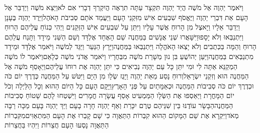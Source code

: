 \documentclass[../main/main.tex]{subfiles}
\begin{document}
\begin{multicols*}{\ncols}
וַיֹּאמֶר יַהְוֶה אֶל מֹשֶׁה הֲיַד יַהְוֶה תִּקְצָר עַתָּה תִרְאֶה הֲיִקְרְךָ דְבָרִי אִם לֹא\PreVerseSpace{}וַיֵּצֵא מֹשֶׁה וַיְדַבֵּר אֶל הָעָם אֵת דִּבְרֵי יַהְוֶה וַיֶּאֱסֹף שִׁבְעִים אִישׁ מִזִּקְנֵי הָעָם וַיַּעֲמֵד אֹתָם סְבִיבֹת הָאֹהֶל\PreVerseSpace{}וַיֵּרֶד יַהְוֶה בֶּעָנָן וַיְדַבֵּר אֵלָיו וַיָּאצֶל מִן הָרוּחַ אֲשֶׁר עָלָיו וַיִּתֵּן עַל שִׁבְעִים אִישׁ הַזְּקֵנִים וַיְהִי כְּנוֹחַ עֲלֵיהֶם הָרוּחַ וַיִּתְנַבְּאוּ וְלֹא יָסָפוּ\PreVerseSpace{}וַיִּשָּׁאֲרוּ שְׁנֵי אֲנָשִׁים בַּמַּחֲנֶה שֵׁם הָאֶחָד אֶלְדָּד וְשֵׁם הַשֵּׁנִי מֵידָד וַתָּנַח עֲלֵהֶם הָרוּחַ וְהֵמָּה בַּכְּתֻבִים וְלֹא יָצְאוּ הָאֹהֱלָה וַיִּתְנַבְּאוּ בַּמַּחֲנֶה\PreVerseSpace{}וַיָּרָץ הַנַּעַר וַיַּגֵּד לְמֹשֶׁה וַיֹּאמַר אֶלְדָּד וּמֵידָד מִתְנַבְּאִים בַּמַּחֲנֶה\PreVerseSpace{}וַיַּעַן יְהוֹשֻׁעַ בִּן נוּן מְשָׁרֵת מֹשֶׁה מִבְּחֻרָיו וַיֹּאמַר אֲדֹנִי מֹשֶׁה כְּלָאֵם\PreVerseSpace{}וַיֹּאמֶר לוֹ מֹשֶׁה הַמְקַנֵּא אַתָּה לִי וּמִי יִתֵּן כָּל עַם יַהְוֶה נְבִיאִים כִּי יִתֵּן יַהְוֶה אֶת רוּחוֹ עֲלֵיהֶם\PreVerseSpace{}וַיֵּאָסֵף מֹשֶׁה אֶל הַמַּחֲנֶה הוּא וְזִקְנֵי יִשְׂרָאֵל\PreVerseSpace{}וְרוּחַ נָסַע מֵאֵת יַהְוֶה וַיָּגֶז\SubEnd{} שְׂלָו\SubEnd{} מִן הַיָּם וַיִּטֹּשׁ עַל הַמַּחֲנֶה כְּדֶרֶךְ יוֹם כֹּה וּכְדֶרֶךְ יוֹם כֹּה סְבִיבוֹת הַמַּחֲנֶה וּכְאַמָּתַיִם עַל פְּנֵי הָאָרֶץ\PreVerseSpace{}וַיָּקָם הָעָם כָּל הַיּוֹם הַהוּא וְכָל הַלַּיְלָה וְכֹל יוֹם הַמָּחֳרָת וַיַּאַסְפוּ אֶת הַשְּׂלָו הַמַּמְעִיט אָסַף עֲשָׂרָה חֳמָרִים וַיִּשְׁטְחוּ לָהֶם שָׁטוֹחַ סְבִיבוֹת הַמַּחֲנֶה\PreVerseSpace{}הַבָּשָׂר עוֹדֶנּוּ בֵּין שִׁנֵּיהֶם טֶרֶם יִכָּרֵת וְאַף יַהְוֶה חָרָה בָעָם וַיַּךְ יַהְוֶה בָּעָם מַכָּה רַבָּה מְאֹד\PreVerseSpace{}וַיִּקְרָא אֶת שֵׁם הַמָּקוֹם הַהוּא קִבְרוֹת הַתַּאֲוָה כִּי שָׁם קָבְרוּ אֶת הָעָם הַמִּתְאַוִּים\PreVerseSpace{}מִקִּבְרוֹת הַתַּאֲוָה נָסְעוּ הָעָם חֲצֵרוֹת וַיִּהְיוּ בַּחֲצֵרוֹת\OpenSection{}\par

\end{multicols*}
\end{document}
